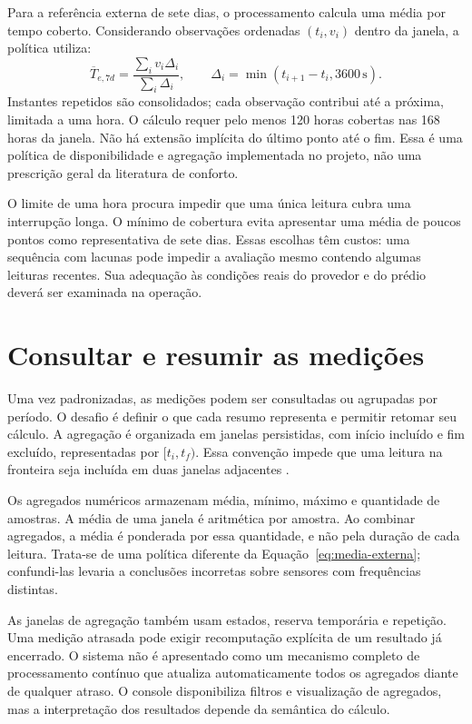 \documentclass[tcc,capa]{texufpel}
\begin{document}
Para a referência externa de sete dias, o processamento calcula uma média por tempo coberto. Considerando observações ordenadas $(t_i,v_i)$ dentro da janela, a política utiliza:
\begin{equation}\label{eq:media-externa}
\overline{T}_{e,7d}=\frac{\sum_i v_i\Delta_i}{\sum_i\Delta_i},\qquad
\Delta_i=\min(t_{i+1}-t_i,3600\,\mathrm{s}).
\end{equation}
Instantes repetidos são consolidados; cada observação contribui até a próxima, limitada a uma hora. O cálculo requer pelo menos 120 horas cobertas nas 168 horas da janela. Não há extensão implícita do último ponto até o fim. Essa é uma política de disponibilidade e agregação implementada no projeto, não uma prescrição geral da literatura de conforto.

O limite de uma hora procura impedir que uma única leitura cubra uma interrupção longa. O mínimo de cobertura evita apresentar uma média de poucos pontos como representativa de sete dias. Essas escolhas têm custos: uma sequência com lacunas pode impedir a avaliação mesmo contendo algumas leituras recentes. Sua adequação às condições reais do provedor e do prédio deverá ser examinada na operação.

\section{Consultar e resumir as medições}
Uma vez padronizadas, as medições podem ser consultadas ou agrupadas por período. O desafio é definir o que cada resumo representa e permitir retomar seu cálculo. A agregação é organizada em janelas persistidas, com início incluído e fim excluído, representadas por $[t_i,t_f)$. Essa convenção impede que uma leitura na fronteira seja incluída em duas janelas adjacentes \cite{akidau2015}.

Os agregados numéricos armazenam média, mínimo, máximo e quantidade de amostras. A média de uma janela é aritmética por amostra. Ao combinar agregados, a média é ponderada por essa quantidade, e não pela duração de cada leitura. Trata-se de uma política diferente da Equação~\ref{eq:media-externa}; confundi-las levaria a conclusões incorretas sobre sensores com frequências distintas.

As janelas de agregação também usam estados, reserva temporária e repetição. Uma medição atrasada pode exigir recomputação explícita de um resultado já encerrado. O sistema não é apresentado como um mecanismo completo de processamento contínuo que atualiza automaticamente todos os agregados diante de qualquer atraso. O console disponibiliza filtros e visualização de agregados, mas a interpretação dos resultados depende da semântica do cálculo.
\end{document}
